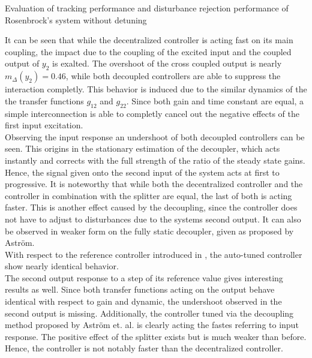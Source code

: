 \begin{table}[H]
\centering
\caption{Evaluation of tracking performance and disturbance rejection performance of Rosenbrock's system without detuning}
\label{c:fotd:s:rosenbrock:tab:eval1}

\end{table}
It can be seen that while the decentralized controller is acting fast on its main coupling, the impact due to the coupling of the excited input and the coupled output of $y_2$ is exalted. The overshoot of the cross coupled output is nearly $m_{\Delta}(y_2) = 0.46$, while both decoupled controllers are able to suppress the interaction completly. This behavior is induced due to the similar dynamics of the the transfer functions $g_{12}$ and $g_{22}$. Since both gain and time constant are equal, a simple interconnection is able to completly cancel out the negative effects of the first input excitation.\\

Observing the input response an undershoot of both decoupled controllers can be seen. This origins in the stationary estimation of the decoupler, which acts instantly and corrects with the full strength of the ratio of the steady state gains. Hence, the signal given onto the second input of the system acts at first to progressive. It is noteworthy that while both the decentralized controller and the controller in combination with the splitter are equal, the last of both is acting faster. This is another effect caused by the decoupling, since the controller does not have to adjust to disturbances due to the systems second output. It can also be observed in weaker form on the fully static decoupler, given as proposed by Astr\"om.\\

With respect to the reference controller introduced in \cite{Astrom2001a}, the auto-tuned controller show nearly identical behavior.\\

The second output response to a step of its reference value gives interesting results as well. Since both transfer functions acting on the output behave identical with respect to gain and dynamic, the undershoot observed in the second output is missing. Additionally, the controller tuned via the decoupling method proposed by Astr\"om et. al. is clearly acting the fastes referring to input response. The positive effect of the splitter exists but is much weaker than before. Hence, the controller is not notably faster than the decentralized controller.\\

